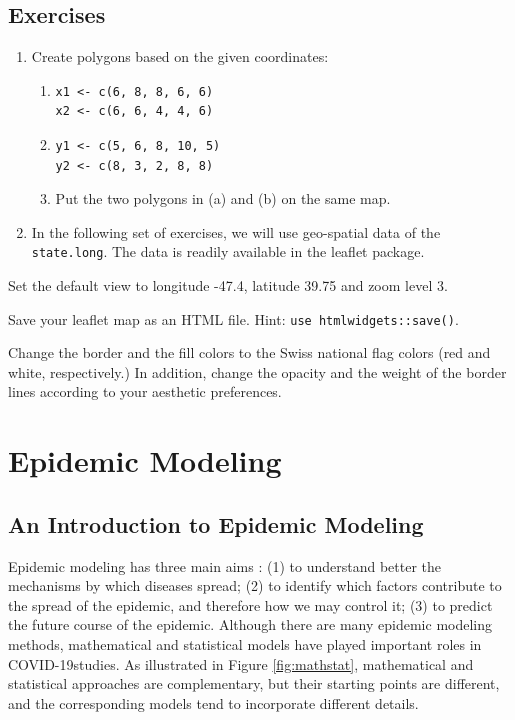 \documentclass[]{book}
\providecommand{\tightlist}{%
  \setlength{\itemsep}{0pt}\setlength{\parskip}{0pt}}
\begin{document}
\section{Exercises}\label{exercises-3}

\begin{enumerate}
\def\labelenumi{\arabic{enumi}.}
\tightlist
\item
  Create polygons based on the given coordinates:

  \begin{enumerate}
  \def\labelenumii{(\alph{enumii})}
  \item
\begin{verbatim}
x1 <- c(6, 8, 8, 6, 6)
x2 <- c(6, 6, 4, 4, 6)
\end{verbatim}
  \item
\begin{verbatim}
y1 <- c(5, 6, 8, 10, 5)
y2 <- c(8, 3, 2, 8, 8)
\end{verbatim}
  \item
    Put the two polygons in (a) and (b) on the same map.
  \end{enumerate}
\item
  In the following set of exercises, we will use geo-spatial data of the
  \texttt{state.long}. The data is readily available in the leaflet
  package.
\end{enumerate}

Set the default view to longitude -47.4, latitude 39.75 and zoom level
3.

Save your leaflet map as an HTML file. Hint:
\texttt{use\ htmlwidgets::save()}.

Change the border and the fill colors to the Swiss national flag colors
(red and white, respectively.) In addition, change the opacity and the
weight of the border lines according to your aesthetic preferences.

\chapter{Epidemic Modeling}\label{modeling}

\section{An Introduction to Epidemic
Modeling}\label{an-introduction-to-epidemic-modeling}

Epidemic modeling has three main aims \citep{Daley:Gani:01}: (1) to
understand better the mechanisms by which diseases spread; (2) to
identify which factors contribute to the spread of the epidemic, and
therefore how we may control it; (3) to predict the future course of the
epidemic. Although there are many epidemic modeling methods,
mathematical and statistical models have played important roles in
COVID-19studies. As illustrated in Figure \ref{fig:mathstat},
mathematical and statistical approaches are complementary, but their
starting points are different, and the corresponding models tend to
incorporate different details.
\end{document}
